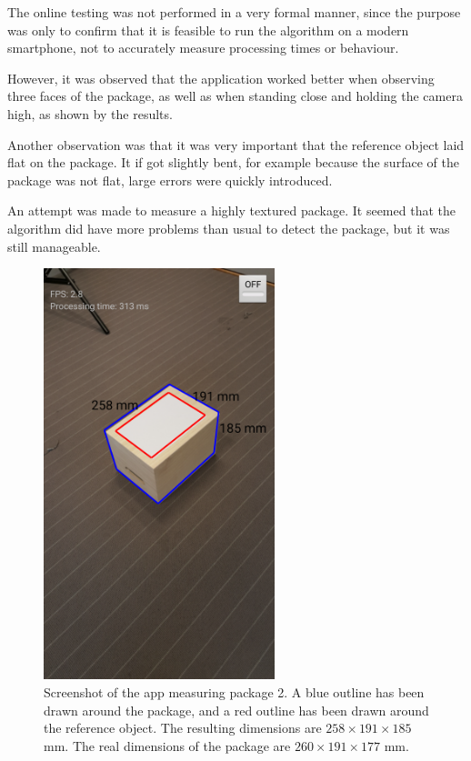 The online testing was not performed in a very formal manner, since the purpose was only to confirm that it is feasible to run the algorithm on a modern smartphone, not to accurately measure processing times or behaviour.

However, it was observed that the application worked better when observing three faces of the package, as well as when standing close and holding the camera high, as shown by the results.

Another observation was that it was very important that the reference object laid flat on the package.
It if got slightly bent, for example because the surface of the package was not flat, large errors were quickly introduced.

An attempt was made to measure a highly textured package.
It seemed that the algorithm did have more problems than usual to detect the package, but it was still manageable.

\begin{figure}
\begin{center}
\includegraphics[width=0.6\textwidth]{figures/screenshot.png}
\end{center}
\caption[A screenshot of the demo application]{Screenshot of the app measuring package 2. A blue outline has been drawn around the package, and a red outline has been drawn around the reference object. The resulting dimensions are $258 \times 191 \times 185$ mm. The real dimensions of the package are $260 \times 191 \times 177$ mm.}
\label{fig:screenshot}
\end{figure}
